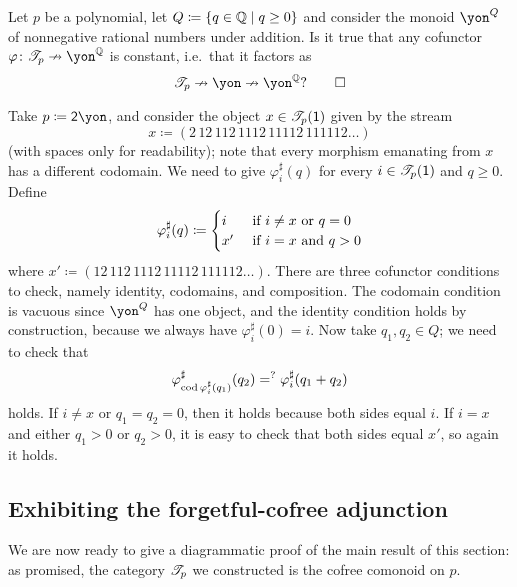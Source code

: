 \documentclass[Book-Poly]{subfiles}
\begin{document}
\begin{exercise}
Let $p$ be a polynomial, let $Q\coloneqq\{q\in\mathbb{Q}\mid q\geq 0\}$ and consider the monoid $\yon^Q$ of nonnegative rational numbers under addition. Is it true that any cofunctor $\varphi\colon\cofree{p}\cof\yon^\qq$ is constant, i.e.\ that it factors as
\[
\cofree{p}\cof\yon\cof\yon^\qq? \qedhere
\]
\begin{solution}
Take $p\coloneqq\2\yon$, and consider the object $x\in\mathscr{T}_{p}(\textsf{1})$ given by the stream
\[
x\coloneqq(2\,12\,112\,1112\,11112\,111112\ldots)
\]
(with spaces only for readability); note that every morphism emanating from $x$ has a different codomain. We need to give $\varphi^\sharp_i(q)$ for every $i\in\mathscr{T}_{p}(\textsf{1})$ and $q\geq 0$. Define
\[
	\varphi^\sharp_i(q)\coloneqq
	\begin{cases}
		i&\textnormal{ if }i\neq x \textnormal{ or } q=0\\
		x'&\textnormal{ if }i=x\textnormal{ and } q>0
	\end{cases}
\]
where $x'\coloneqq(12\,112\,1112\,11112\,111112\ldots)$. There are three cofunctor conditions to check, namely identity, codomains, and composition. The codomain condition is vacuous since $\yon^Q$ has one object, and the identity condition holds by construction, because we always have $\varphi^\sharp_i(0)=i$. Now take $q_1,q_2\in Q$; we need to check that
\[\varphi^\sharp_{\operatorname{cod}\varphi^\sharp_i(q_1)}(q_2)=^?\varphi^\sharp_i(q_1+q_2)\]
holds. If $i\neq x$ or $q_1=q_2=0$, then it holds because both sides equal $i$. If $i=x$ and either $q_1>0$ or $q_2>0$, it is easy to check that both sides equal $x'$, so again it holds.
\end{solution}
\end{exercise}


\subsection{Exhibiting the forgetful-cofree adjunction}

We are now ready to give a diagrammatic proof of the main result of this section: as promised, the category $\mathscr{T}_{p}$ we constructed is the cofree comonoid on $p$.
\end{document}
